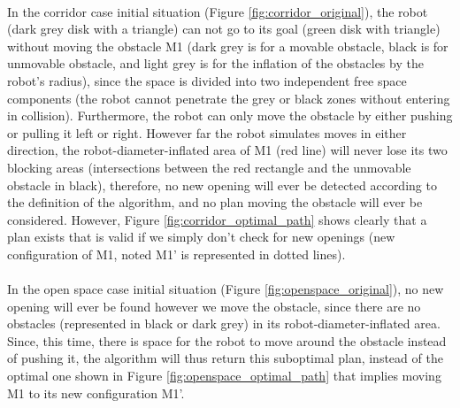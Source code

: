 \paragraph{} In the corridor case initial situation (Figure \ref{fig:corridor_original}),   the robot (dark grey disk with a triangle) can not go to its goal (green disk with triangle) without moving the obstacle M1 (dark grey is for a movable obstacle, black is for unmovable obstacle, and light grey is for the inflation of the obstacles by the robot's radius), since the space is divided into two independent free space components (the robot cannot penetrate the grey or black zones without entering in collision). Furthermore, the robot can only move the obstacle by either pushing or pulling it left or right. However far the robot simulates moves in either direction, the robot-diameter-inflated area of M1 (red line) will never lose its two blocking areas (intersections between the red rectangle and the unmovable obstacle in black), therefore, no new opening will ever be detected according to the definition of the algorithm, and no plan moving the obstacle will ever be considered. However, Figure \ref{fig:corridor_optimal_path} shows clearly that a plan exists that is valid if we simply don't check for new openings (new configuration of M1, noted M1' is represented in dotted lines).

\paragraph{} In the open space case initial situation (Figure \ref{fig:openspace_original}), no new opening will ever be found however we move the obstacle, since there are no obstacles (represented in black or dark grey) in its robot-diameter-inflated area. Since, this time, there is space for the robot to move around the obstacle instead of pushing it, the algorithm will thus return this suboptimal plan, instead of the optimal one shown in Figure \ref{fig:openspace_optimal_path} that implies moving M1 to its new configuration M1'.

